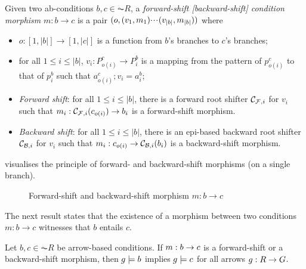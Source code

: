 \begin{definition}
  Given two ab-conditions $b,c \in \AC{R}$, a \emph{forward-shift [backward-shift] condition morphism} $m: b \to c$ is a pair $(o,(v_1,m_1){\cdotp\mkern-2mu\cdotp\mkern-2mu\cdotp\mkern1mu} (v_{|b|},m_{|b|}))$ where
  \begin{itemize}
  \item $o:[1,|b|]\to[1,|c|]$ is a function from $b$'s branches to $c$'s branches;
  \item for all $1\leq i\leq |b|$, $v_i:P^c_{o(i)}\to P^b_i$ is a mapping from the pattern of $p^c_{o(i)}$ to that of $p^b_i$ such that $a^c_{o(i)};v_i=a^b_i$;
  \item\emph{Forward shift}: for all $1\leq i\leq |b|$, there is a forward root shifter $\mathcal{C}_{\mathcal{F},i}$ for $v_i$ such that $m_i:\mathcal{C}_{\mathcal{F},i}(c_{o(i)})\to b_i$ is a forward-shift morphism.
  \item\emph{Backward shift}: for all $1\leq i\leq |b|$, there is an epi-based backward root shifter $\mathcal{C}_{\mathcal{B},i}$ for $v_i$ such that $m_i:c_{o(i)}\to \mathcal{C}_{\mathcal{B},i}(b_i)$ is a backward-shift morphism.
  \end{itemize}
\end{definition}
%
 visualises the principle of forward- and backward-shift morphisms (on a single branch).
%
\begin{figure}
\centering

\caption{Forward-shift and backward-shift morphism $m:b\to c$}
\end{figure}

The next result states that the existence of a morphism between two conditions $m: b \to c$ witnesses that $b$ entails $c$.

\begin{proposition}
Let $b,c \in \AC{R}$  be arrow-based conditions. If $m:b\rightarrow c$ is a forward-shift or a backward-shift morphism, then $g\models b$ implies $g \models c$ for all arrows $g:R\rightarrow G$. 
\end{proposition}

